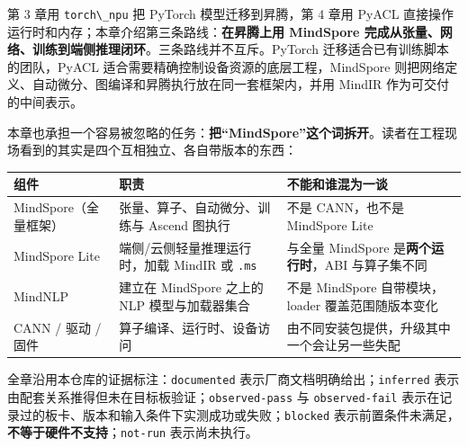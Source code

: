 第 3 章用 \passthrough{\lstinline!torch\_npu!} 把 PyTorch
模型迁移到昇腾，第 4 章用 PyACL
直接操作运行时和内存；本章介绍第三条路线：\textbf{在昇腾上用 MindSpore
完成从张量、网络、训练到端侧推理闭环}。三条路线并不互斥。PyTorch
迁移适合已有训练脚本的团队，PyACL
适合需要精确控制设备资源的底层工程，MindSpore
则把网络定义、自动微分、图编译和昇腾执行放在同一套框架内，并用 MindIR
作为可交付的中间表示。

本章也承担一个容易被忽略的任务：\textbf{把``MindSpore''这个词拆开}。读者在工程现场看到的其实是四个互相独立、各自带版本的东西：

\begin{longtable}[]{@{}
  >{\raggedright\arraybackslash}p{}
  >{\raggedright\arraybackslash}p{}
  >{\raggedright\arraybackslash}p{}@{}}
\toprule\noalign{}
\begin{minipage}[b]{\linewidth}\raggedright
组件
\end{minipage} & \begin{minipage}[b]{\linewidth}\raggedright
职责
\end{minipage} & \begin{minipage}[b]{\linewidth}\raggedright
不能和谁混为一谈
\end{minipage} \\
\midrule\noalign{}
\endhead
\bottomrule\noalign{}
\endlastfoot
MindSpore（全量框架） & 张量、算子、自动微分、训练与 Ascend 图执行 &
不是 CANN，也不是 MindSpore Lite \\
MindSpore Lite & 端侧/云侧轻量推理运行时，加载 MindIR 或
\passthrough{\lstinline!.ms!} & 与全量 MindSpore
是\textbf{两个运行时}，ABI 与算子集不同 \\
MindNLP & 建立在 MindSpore 之上的 NLP 模型与加载器集合 & 不是 MindSpore
自带模块，loader 覆盖范围随版本变化 \\
CANN / 驱动 / 固件 & 算子编译、运行时、设备访问 &
由不同安装包提供，升级其中一个会让另一些失配 \\
\end{longtable}

全章沿用本仓库的证据标注：\passthrough{\lstinline!documented!}
表示厂商文档明确给出；\passthrough{\lstinline!inferred!}
表示由配套关系推得但未在目标板验证；\passthrough{\lstinline!observed-pass!}
与 \passthrough{\lstinline!observed-fail!}
表示在记录过的板卡、版本和输入条件下实测成功或失败；\passthrough{\lstinline!blocked!}
表示前置条件未满足，\textbf{不等于硬件不支持}；\passthrough{\lstinline!not-run!}
表示尚未执行。

